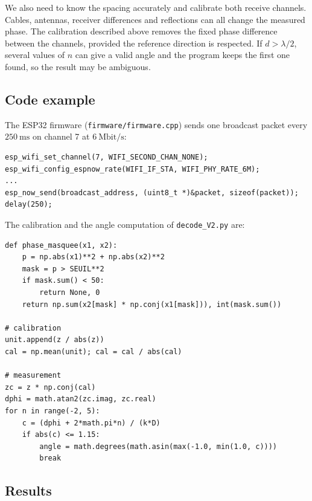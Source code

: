 We also need to know the spacing accurately and calibrate both receive
channels. Cables, antennas, receiver differences and reflections can all
change the measured phase. The calibration described above removes the fixed
phase difference between the channels, provided the reference direction is
respected. If \(d>\lambda/2\), several values of \(n\) can give a valid angle
and the program keeps the first one found, so the result may be ambiguous.

\subsection{Code example}

The ESP32 firmware (\texttt{firmware/firmware.cpp}) sends one broadcast
packet every \(250~\mathrm{ms}\) on channel 7 at \(6~\mathrm{Mbit/s}\):

\begin{verbatim}
esp_wifi_set_channel(7, WIFI_SECOND_CHAN_NONE);
esp_wifi_config_espnow_rate(WIFI_IF_STA, WIFI_PHY_RATE_6M);
...
esp_now_send(broadcast_address, (uint8_t *)&packet, sizeof(packet));
delay(250);
\end{verbatim}

The calibration and the angle computation of \texttt{decode\_V2.py} are:

\begin{verbatim}
def phase_masquee(x1, x2):
    p = np.abs(x1)**2 + np.abs(x2)**2
    mask = p > SEUIL**2
    if mask.sum() < 50:
        return None, 0
    return np.sum(x2[mask] * np.conj(x1[mask])), int(mask.sum())

# calibration
unit.append(z / abs(z))
cal = np.mean(unit); cal = cal / abs(cal)

# measurement
zc = z * np.conj(cal)
dphi = math.atan2(zc.imag, zc.real)
for n in range(-2, 5):
    c = (dphi + 2*math.pi*n) / (k*D)
    if abs(c) <= 1.15:
        angle = math.degrees(math.asin(max(-1.0, min(1.0, c))))
        break
\end{verbatim}

\subsection{Results}
